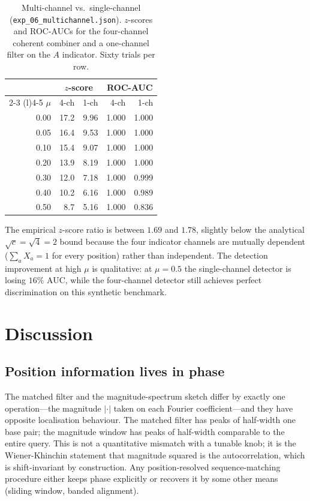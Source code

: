 \documentclass[11pt,a4paper]{article}
\theoremstyle{definition}
\theoremstyle{remark}
\begin{document}
\begin{table}[t]
  \centering\small
  \caption{Multi-channel vs.\ single-channel
  (\texttt{exp\_06\_multichannel.json}). $z$-scores and ROC-AUCs for
  the four-channel coherent combiner and a one-channel filter on the
  $A$ indicator. Sixty trials per row.}
  \label{tab:multi_ch}
  \begin{tabular}{r | r r r r}
    \toprule
    & \multicolumn{2}{c}{$z$-score} & \multicolumn{2}{c}{ROC-AUC} \\
    \cmidrule(l){2-3} \cmidrule(l){4-5}
    $\mu$ & 4-ch & 1-ch & 4-ch & 1-ch \\
    \midrule
    0.00 & 17.2 & 9.96 & 1.000 & 1.000 \\
    0.05 & 16.4 & 9.53 & 1.000 & 1.000 \\
    0.10 & 15.4 & 9.07 & 1.000 & 1.000 \\
    0.20 & 13.9 & 8.19 & 1.000 & 1.000 \\
    0.30 & 12.0 & 7.18 & 1.000 & 0.999 \\
    0.40 & 10.2 & 6.16 & 1.000 & 0.989 \\
    0.50 & \phantom{0}8.7 & 5.16 & 1.000 & 0.836 \\
    \bottomrule
  \end{tabular}
\end{table}

The empirical $z$-score ratio is between $1.69$ and $1.78$, slightly
below the analytical $\sqrt{c} = \sqrt{4} = 2$ bound because the four
indicator channels are mutually dependent ($\sum_a X_a = 1$ for every
position) rather than independent. The detection improvement at high
$\mu$ is qualitative: at $\mu = 0.5$ the single-channel detector is
losing $16\%$ AUC, while the four-channel detector still achieves
perfect discrimination on this synthetic benchmark.

\section{Discussion}
\label{sec:discussion}

\subsection{Position information lives in phase}

The matched filter and the magnitude-spectrum sketch differ by exactly
one operation---the magnitude $|\cdot|$ taken on each Fourier
coefficient---and they have opposite localisation behaviour. The
matched filter has peaks of half-width one base pair; the magnitude
window has peaks of half-width comparable to the entire query. This is
not a quantitative mismatch with a tunable knob; it is the
Wiener-Khinchin statement that magnitude squared is the autocorrelation,
which is shift-invariant by construction. Any position-resolved
sequence-matching procedure either keeps phase explicitly or recovers
it by some other means (sliding window, banded alignment).
\end{document}
